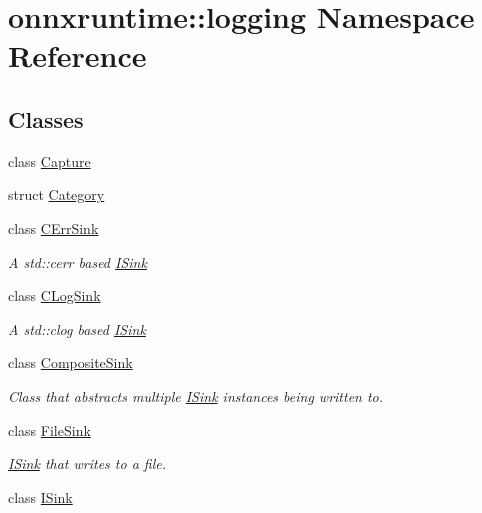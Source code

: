 \hypertarget{namespaceonnxruntime_1_1logging}{}\section{onnxruntime\+:\+:logging Namespace Reference}
\label{namespaceonnxruntime_1_1logging}
\subsection*{Classes}
\begin{DoxyCompactItemize}
\item 
class \mbox{\hyperlink{classonnxruntime_1_1logging_1_1Capture}{Capture}}
\item 
struct \mbox{\hyperlink{structonnxruntime_1_1logging_1_1Category}{Category}}
\item 
class \mbox{\hyperlink{classonnxruntime_1_1logging_1_1CErrSink}{C\+Err\+Sink}}
\begin{DoxyCompactList}\small\item\em A std\+::cerr based \mbox{\hyperlink{classonnxruntime_1_1logging_1_1ISink}{I\+Sink}} \end{DoxyCompactList}\item 
class \mbox{\hyperlink{classonnxruntime_1_1logging_1_1CLogSink}{C\+Log\+Sink}}
\begin{DoxyCompactList}\small\item\em A std\+::clog based \mbox{\hyperlink{classonnxruntime_1_1logging_1_1ISink}{I\+Sink}} \end{DoxyCompactList}\item 
class \mbox{\hyperlink{classonnxruntime_1_1logging_1_1CompositeSink}{Composite\+Sink}}
\begin{DoxyCompactList}\small\item\em Class that abstracts multiple \mbox{\hyperlink{classonnxruntime_1_1logging_1_1ISink}{I\+Sink}} instances being written to. \end{DoxyCompactList}\item 
class \mbox{\hyperlink{classonnxruntime_1_1logging_1_1FileSink}{File\+Sink}}
\begin{DoxyCompactList}\small\item\em \mbox{\hyperlink{classonnxruntime_1_1logging_1_1ISink}{I\+Sink}} that writes to a file. \end{DoxyCompactList}\item 
class \mbox{\hyperlink{classonnxruntime_1_1logging_1_1ISink}{I\+Sink}}
\item 

\end{DoxyCompactItemize}
